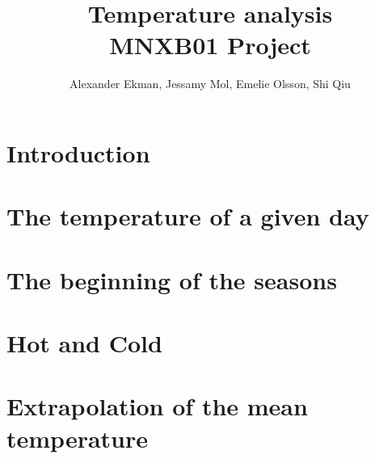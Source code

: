 \documentclass[a4paper]{article}
\title{\textbf{Temperature analysis } \\ 
\vspace{5pt}
\large MNXB01 Project}
\author{Alexander Ekman, Jessamy Mol, Emelie Olsson, Shi Qiu}
\date{ }
\begin{document}
 
 
 

\maketitle

\vspace{-24pt}
\section{Introduction}
 


\section{The temperature of a given day}


\section{The beginning of the seasons}


\section{Hot and Cold}


\section{Extrapolation of the mean temperature}


\newpage


 
\end{document}
